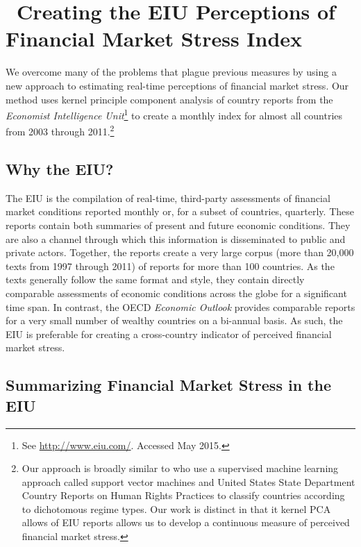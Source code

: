 \documentclass[]{article}
\begin{document}
\section{~Creating the EIU Perceptions of Financial Market Stress
Index}\label{creating-the-perceptions-of-financial-market-stress-index}

We overcome many of the problems that plague previous measures by using a new approach to estimating real-time perceptions of financial market stress. Our method uses kernel principle component analysis \citep{Scholkopf1998,lodhi2002,Spirling2012} of country reports from the \emph{Economist Intelligence Unit}\footnote{See \url{http://www.eiu.com/}. Accessed May 2015.} to create a monthly index for almost all countries from 2003 through 2011.\footnote{Our approach is broadly similar to \cite{Minhas2015} who use a supervised machine learning approach called support vector machines and United States State Department Country Reports on Human Rights Practices to classify countries according to dichotomous regime types. Our work is distinct in that it kernel PCA allows of EIU reports allows us to develop a continuous measure of perceived financial market stress.}

\subsection{Why the EIU?}\label{why-the-eiu}

The EIU is the compilation of real-time, third-party
assessments of financial market conditions reported monthly or, for a subset of countries, quarterly. These reports contain both summaries of
present and future economic conditions. They are also a channel through which this information is disseminated to public and private actors. Together, the reports create a very large corpus
(more than 20,000 texts from 1997 through 2011) of
reports for more than 100 countries. As the texts generally follow the
same format and style, they contain directly comparable assessments of
economic conditions across the globe for a significant time
span. In contrast, the OECD \emph{Economic Outlook} provides comparable
reports for a very small number of wealthy countries on a bi-annual
basis. As such, the EIU is preferable for creating a cross-country indicator of perceived financial market stress.

\subsection{Summarizing Financial Market Stress in the
EIU}\label{summarizing-financial-market-stress-in-the-eiu}
\end{document}
